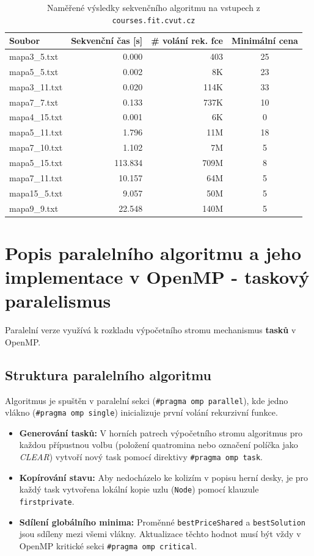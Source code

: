 \documentclass[11pt,a4paper]{article}
\begin{document}
\begin{table}[h!]
\centering
\caption{Naměřené výsledky sekvenčního algoritmu na vstupech z \texttt{courses.fit.cvut.cz}}
\begin{tabular}{lrrc}
\toprule
\textbf{Soubor} & \textbf{Sekvenční čas [s]} & \textbf{\# volání rek. fce} & \textbf{Minimální cena} \\ 
\midrule
mapa3\_5.txt  & 0.000   & 403   & 25 \\
mapa5\_5.txt  & 0.002   & 8K    & 23 \\
mapa3\_11.txt & 0.020   & 114K  & 33 \\
mapa7\_7.txt  & 0.133   & 737K  & 10 \\
mapa4\_15.txt & 0.001   & 6K    & 0  \\
mapa5\_11.txt & 1.796   & 11M   & 18 \\
mapa7\_10.txt & 1.102   & 7M    & 5  \\
mapa5\_15.txt & 113.834 & 709M  & 8  \\
mapa7\_11.txt & 10.157  & 64M   & 5  \\
mapa15\_5.txt & 9.057   & 50M   & 5  \\
mapa9\_9.txt  & 22.548  & 140M  & 5  \\
\bottomrule
\end{tabular}
\end{table}

\newpage

\section{Popis paralelního algoritmu a jeho implementace v OpenMP - taskový paralelismus}
Paralelní verze využívá k rozkladu výpočetního stromu mechanismus \textbf{tasků} v OpenMP.
\subsection{Struktura paralelního algoritmu}
Algoritmus je spuštěn v paralelní sekci (\texttt{\#pragma omp parallel}), kde jedno vlákno (\texttt{\#pragma omp single}) inicializuje první volání rekurzivní funkce.
\begin{itemize}
    \item \textbf{Generování tasků:} V horních patrech výpočetního stromu algoritmus pro každou přípustnou volbu (položení quatromina nebo označení políčka jako \textit{CLEAR}) vytvoří nový task pomocí direktivy \texttt{\#pragma omp task}.
    \item \textbf{Kopírování stavu:} Aby nedocházelo ke kolizím v popisu herní desky, je pro každý task vytvořena lokální kopie uzlu (\texttt{Node}) pomocí klauzule \texttt{firstprivate}.
    \item \textbf{Sdílení globálního minima:} Proměnné \texttt{bestPriceShared} a \texttt{bestSolution} jsou sdíleny mezi všemi vlákny. Aktualizace těchto hodnot musí být vždy v OpenMP kritické sekci \texttt{\#pragma omp critical}.
\end{itemize}
\end{document}
